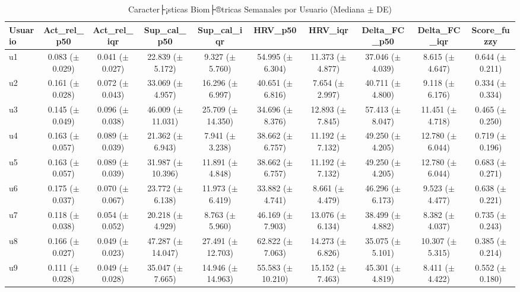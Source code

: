 \begin{landscape}
\begin{table}[p]
\centering
\caption{Caracter├¡sticas Biom├®tricas Semanales por Usuario (Mediana $\pm$ DE)}
\label{tab:caracteristicas_usuario}
\tiny
\begin{tabular}{@{}lccccccccc@{}}
\toprule
\textbf{Usuario} & \textbf{Act\_rel\_p50} & \textbf{Act\_rel\_iqr} & \textbf{Sup\_cal\_p50} & \textbf{Sup\_cal\_iqr} & \textbf{HRV\_p50} & \textbf{HRV\_iqr} & \textbf{Delta\_FC\_p50} & \textbf{Delta\_FC\_iqr} & \textbf{Score\_fuzzy} \\
\midrule
u1  & 0.083 ($\pm$0.029) & 0.041 ($\pm$0.027) & 22.839 ($\pm$5.172)  & 9.327 ($\pm$5.760)   & 54.995 ($\pm$6.304) & 11.373 ($\pm$4.877) & 37.046 ($\pm$4.039) & 8.615 ($\pm$4.647)  & 0.644 ($\pm$0.211) \\
u2  & 0.161 ($\pm$0.028) & 0.072 ($\pm$0.043) & 33.069 ($\pm$4.957)  & 16.296 ($\pm$6.997)  & 40.651 ($\pm$6.816) & 7.654 ($\pm$2.997)  & 40.711 ($\pm$4.800) & 9.118 ($\pm$6.176)  & 0.334 ($\pm$0.334) \\
u3  & 0.145 ($\pm$0.049) & 0.096 ($\pm$0.038) & 46.009 ($\pm$11.031) & 25.709 ($\pm$14.350) & 34.696 ($\pm$8.376) & 12.893 ($\pm$7.845) & 57.413 ($\pm$8.047) & 11.451 ($\pm$4.718) & 0.465 ($\pm$0.250) \\
u4  & 0.163 ($\pm$0.057) & 0.089 ($\pm$0.039) & 21.362 ($\pm$6.943)  & 7.941 ($\pm$3.238)   & 38.662 ($\pm$6.757) & 11.192 ($\pm$7.132) & 49.250 ($\pm$4.205) & 12.780 ($\pm$6.044) & 0.719 ($\pm$0.196) \\
u5  & 0.163 ($\pm$0.057) & 0.089 ($\pm$0.039) & 31.987 ($\pm$10.396) & 11.891 ($\pm$4.848)  & 38.662 ($\pm$6.757) & 11.192 ($\pm$7.132) & 49.250 ($\pm$4.205) & 12.780 ($\pm$6.044) & 0.683 ($\pm$0.271) \\
u6  & 0.175 ($\pm$0.037) & 0.070 ($\pm$0.067) & 23.772 ($\pm$6.138)  & 11.973 ($\pm$6.419)  & 33.882 ($\pm$4.741) & 8.661 ($\pm$4.479)  & 46.296 ($\pm$6.173) & 9.523 ($\pm$4.477)  & 0.638 ($\pm$0.221) \\
u7  & 0.118 ($\pm$0.038) & 0.054 ($\pm$0.052) & 20.218 ($\pm$4.929)  & 8.763 ($\pm$5.960)   & 46.169 ($\pm$7.903) & 13.076 ($\pm$6.134) & 38.499 ($\pm$4.882) & 8.382 ($\pm$4.037)  & 0.735 ($\pm$0.243) \\
u8  & 0.166 ($\pm$0.027) & 0.049 ($\pm$0.023) & 47.287 ($\pm$14.047) & 27.491 ($\pm$12.703) & 62.822 ($\pm$7.063) & 14.273 ($\pm$6.826) & 35.075 ($\pm$5.101) & 10.307 ($\pm$5.315) & 0.385 ($\pm$0.214) \\
u9  & 0.111 ($\pm$0.028) & 0.049 ($\pm$0.028) & 35.047 ($\pm$7.665)  & 14.946 ($\pm$14.963) & 55.583 ($\pm$10.210) & 15.152 ($\pm$7.463) & 45.301 ($\pm$4.819) & 8.411 ($\pm$4.422) & 0.552 ($\pm$0.180) \\

\end{tabular}
\end{table}
\end{landscape}
